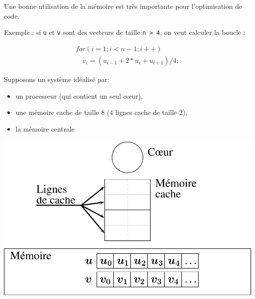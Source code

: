 \documentclass{beamer}
\begin{document}
\begin{frame}[fragile]
	Une bonne utilisation de la mémoire est très importante pour l'optimisation de code.
	\bigskip

	Exemple : si \verb|u| et \verb|v| sont des vecteurs de taille \verb|n > 4|, on veut calculer la boucle :

\begin{equation}
\begin{array}{l}
for (i=1; i<n-1; i++) \\
\quad  v_i = (u_{i-1} + 2*u_{i} + u_{i+1})/4;
\end{array}
\end{equation}

\end{frame}

\begin{frame}
	Supposons un système idéalisé par: 
	\begin{itemize}
		\item un processeur (qui contient un seul c\oe ur), 
		\item une mémoire cache de taille 8 (4 lignes cache de taille 2),
		\item la mémoire centrale
	\end{itemize}
	\begin{center}
	\includegraphics[scale=0.5]{../../Images/sequentiel}
   \end{center}
\end{frame}
\end{document}
